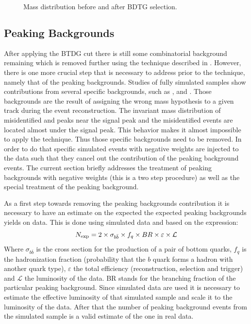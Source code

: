 \begin{figure}[h]
\begin{center}
\caption{Mass distribution before and after BDTG selection.}
\label{mass_BDTG_selection}
\end{center}
\end{figure}

\subsection{Peaking Backgrounds}
\label{peaking_backgrounds}

After applying the BTDG cut there is still some combinatorial background remaining which is removed
further using the \sPlot technique described in . However, there is
one more crucial step that is necessary to address prior to the \sPlot technique, namely that of the peaking backgrounds.
Studies of fully simulated samples show contributions from several specific backgrounds, such as \BsJpsiKK, \BsJpsipipi and \BdJpsipipi.
Those backgrounds are the result of assigning the wrong mass hypothesis to a given track during the event reconstruction.  
The invariant mass distribution of misidentified \BdJpsipipi and \BsJpsipipi peaks near the \BsJpsiKpi signal peak
and the misidentified \BsJpsiKK events are located almost under the \BdJpsiKpi signal peak. 
This behavior makes it almost impossible to apply the \sPlot technique. Thus those specific backgrounds need to be removed. 
In order to do that specific simulated events with negative weights are injected to the data such that they cancel out the
contribution of the peaking background events. The current section briefly addresses the treatment of peaking backgrounds 
with negative weights (this is a two step procedure) as well as the special treatment of the \LbJpsippi peaking background.

As a first step towards removing the peaking backgrounds contribution it is necessary to have an estimate on the expected 
the expected peaking backgrounds yields on data. This is done using simulated data and based on the expression:
\begin{equation}
N_{\rm exp} = 2 \times \sigma_{b\bar{b}}\times f_q \times BR \times \varepsilon \times {\mathcal{L}}
\end{equation}
\noindent Where $\sigma_{b\bar{b}}$ is the cross section for the production of a pair of bottom quarks, $f_q$ is the hadronization fraction
(probability that the $b$ quark forms a hadron with another quark type), $\varepsilon$ the total efficiency (reconstruction, selection and trigger)
and ${\mathcal{L}}$ the luminosity of the data. BR stands for the branching fraction of the particular peaking background. Since simulated data are used
it is necessary to estimate the effective luminosity of that simulated sample and scale it to the luminosity of the data. After that the number of
peaking background events from the simulated sample is a valid estimate of the one in real data.

